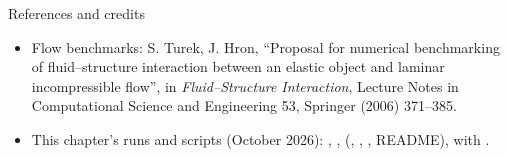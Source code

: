 \documentclass[aspectratio=169,11pt]{beamer}
\begin{document}
\begin{frame}{References and credits}
\begin{itemize}
  \item Flow benchmarks: S. Turek, J. Hron, ``Proposal for numerical benchmarking of fluid--structure interaction between an elastic object and laminar incompressible flow'', in \emph{Fluid--Structure Interaction}, Lecture Notes in Computational Science and Engineering 53, Springer (2006) 371--385.
  \item This chapter's runs and scripts (October 2026): , ,  (, , , README), with .
\end{itemize}
\end{frame}
\end{document}
